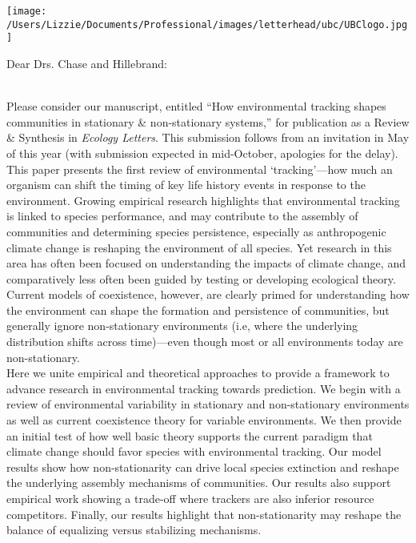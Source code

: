 \documentclass[12pt,a4paper]{letter}
\begin{document}
\begin{letter}{}
\texttt{[image: /Users/Lizzie/Documents/Professional/images/letterhead/ubc/UBClogo.jpg]}
\opening{Dear Drs. Chase and Hillebrand:}
\vspace{1.5ex}\\
Please consider our manuscript, entitled ``How environmental tracking shapes communities in stationary \& non-stationary systems,'' for publication as a Review \& Synthesis in \emph{Ecology Letters}. This submission follows from an invitation in May of this year (with submission expected in mid-October, apologies for the delay). 
\vspace{1.5ex}\\
This paper presents the first review of environmental `tracking'---how much an organism can shift the timing of key life history events in response to the environment. Growing empirical research highlights that environmental tracking is linked to species performance, and may contribute to the assembly of communities and determining species persistence, especially as anthropogenic climate change is reshaping the environment of all species. Yet research in this area has often been focused on understanding the impacts of climate change, and comparatively less often been guided by testing or developing ecological theory. Current models of coexistence, however, are clearly primed for understanding how the environment can shape the formation and persistence of communities, but generally ignore non-stationary environments (i.e, where the underlying distribution shifts across time)---even though most or all environments today are non-stationary. 
\vspace{1.5ex}\\
Here we unite empirical and theoretical approaches to provide a framework to advance research in environmental tracking towards prediction. We begin with a review of environmental variability in stationary and non-stationary environments as well as current coexistence theory for variable environments. We then provide an initial test of how well basic theory supports the current paradigm that climate change should favor species with environmental tracking. Our model results show how non-stationarity can drive local species extinction and reshape the underlying assembly mechanisms of communities. Our results also support empirical work showing a trade-off where trackers are also inferior resource competitors. Finally, our results highlight that non-stationarity may reshape the balance of equalizing versus stabilizing mechanisms. 

\end{letter}
\end{document}
